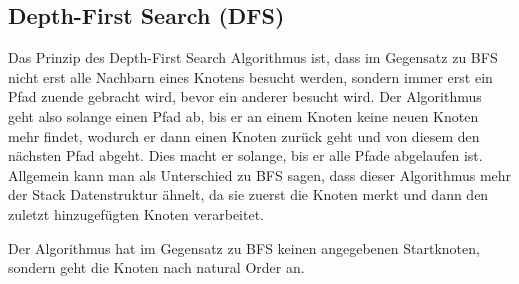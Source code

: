 \documentclass[
../AuD-Zusammenfassung.tex,
]
{subfiles}
\begin{document}
\subsection{Depth-First Search (DFS)}
Das Prinzip des Depth-First Search Algorithmus ist, dass im Gegensatz zu BFS nicht erst alle Nachbarn eines Knotens besucht werden, sondern immer erst ein Pfad zuende gebracht wird, bevor ein anderer besucht wird. Der Algorithmus geht also solange einen Pfad ab, bis er an einem Knoten keine neuen Knoten mehr findet, wodurch er dann einen Knoten zurück geht und von diesem den nächsten Pfad abgeht. Dies macht er solange, bis er alle Pfade abgelaufen ist.\\ Allgemein kann man als Unterschied zu BFS sagen, dass dieser Algorithmus mehr der Stack Datenstruktur ähnelt, da sie zuerst die Knoten merkt und dann den zuletzt hinzugefügten Knoten verarbeitet.\\
\begin{algorithm}[H]

\end{algorithm}
Der Algorithmus hat im Gegensatz zu BFS keinen angegebenen Startknoten, sondern geht die Knoten nach natural Order an. 
\newpage
\end{document}
